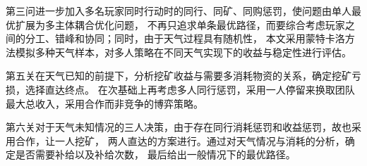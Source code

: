 第三问进一步加入多名玩家同时行动时的同行、同矿、同购惩罚，使问题由单人最优扩展为多主体耦合优化问题，
%
不再只追求单条最优路径，而要综合考虑玩家之间的分工、错峰和协同；同时，由于天气过程具有随机性，
%
本文采用蒙特卡洛方法模拟多种天气样本，对多人策略在不同天气实现下的收益与稳定性进行评估。

第五关在天气已知的前提下，分析挖矿收益与需要多消耗物资的关系，确定挖矿亏损，选择直达终点。
%
在次基础上再考虑多人同行惩罚，采用一人停留来换取团队最大总收入，采用合作而非竞争的博弈策略。

第六关对于天气未知情况的三人决策，由于存在同行消耗惩罚和收益惩罚，故也采用合作，让一人挖矿，
%
两人直达的方案进行。通过对天气情况与消耗的分析，确定是否需要补给以及补给次数，
%
最后给出一般情况下的最优路径。